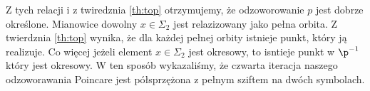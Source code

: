 Z tych relacji i z twiredznia \ref{th:top} otrzymujemy, że odzoworowanie $ p $ jest dobrze określone. Mianowice dowolny $ x \in \Sigma_2 $ 
jest relazizowany jako pełna orbita. Z twierdznia \ref{th:top} wynika, że dla każdej pełnej orbity istnieje punkt, który ją realizuje. Co więcej
jeżeli element $ x \in \Sigma_2 $ jest okresowy, to isntieje punkt w $ \p^{-1} $ który jest okresowy. 
W ten sposób wykazaliśmy, że czwarta iteracja naszego odzoworawania Poincare jest półsprzężona z pełnym sziftem na dwóch symbolach.














